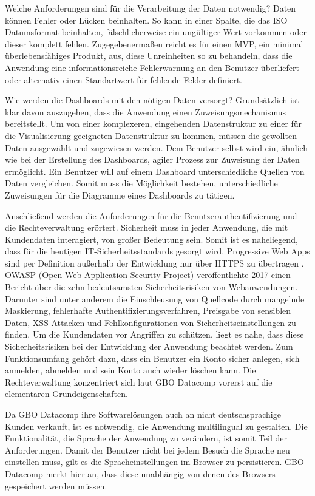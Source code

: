 Welche Anforderungen sind für die Verarbeitung der Daten notwendig? Daten können Fehler oder Lücken
beinhalten. So kann in einer Spalte, die das ISO Datumsformat beinhalten, fälschlicherweise ein
ungültiger Wert vorkommen oder dieser komplett fehlen. Zugegebenermaßen reicht es für einen MVP, ein
minimal überlebensfähiges Produkt, aus, diese Unreinheiten so zu behandeln, dass die Anwendung
eine informationsreiche Fehlerwarnung an den Benutzer überliefert oder alternativ einen Standartwert
für fehlende Felder definiert.

Wie werden die Dashboards mit den nötigen Daten versorgt? Grundsätzlich ist klar davon auszugehen,
dass die Anwendung einen Zuweisungsmechanismus bereitstellt. Um von einer komplexeren, eingehenden
Datenstruktur zu einer für die Visualisierung geeigneten Datenstruktur zu kommen, müssen die gewollten
Daten ausgewählt und zugewiesen werden. Dem Benutzer selbst wird ein, ähnlich wie bei der Erstellung
des Dashboards, agiler Prozess zur Zuweisung der Daten ermöglicht. Ein Benutzer will auf einem
Dashboard unterschiedliche Quellen von Daten vergleichen. Somit muss die Möglichkeit bestehen,
unterschiedliche Zuweisungen für die Diagramme eines Dashboards zu tätigen.

Anschließend werden die Anforderungen für die Benutzerauthentifizierung und die Rechteverwaltung erörtert.
Sicherheit muss in jeder Anwendung, die mit Kundendaten interagiert, von großer Bedeutung sein.
Somit ist es naheliegend, dass für die heutigen IT-Sicherheitsstandards gesorgt wird. Progressive
Web Apps sind per Definition außerhalb der Entwicklung nur über HTTPS zu übertragen \cite[S. 16]{KevinFrankPWAMasterarbeit}.
OWASP (Open Web Application Security Project) veröffentlichte 2017 einen Bericht über die zehn
bedeutsamsten Sicherheitsrisiken von Webanwendungen. Darunter sind unter anderem die Einschleusung
von Quellcode durch mangelnde Maskierung, fehlerhafte Authentifizierungsverfahren, Preisgabe von sensiblen Daten,
XSS-Attacken und Fehlkonfigurationen von Sicherheitseinstellungen zu finden.\cite[S. 4]{OWASPTopTen}
Um die Kundendaten vor Angriffen zu schützen, liegt es nahe, dass diese Sicherheitsrisiken bei der
Entwicklung der Anwendung beachtet werden. Zum Funktionsumfang gehört dazu,
dass ein Benutzer ein Konto sicher anlegen, sich anmelden, abmelden und sein Konto auch wieder
löschen kann. Die Rechteverwaltung konzentriert sich laut GBO Datacomp vorerst auf die elementaren
Grundeigenschaften.

Da GBO Datacomp ihre Softwarelösungen auch an nicht deutschsprachige Kunden verkauft, ist es notwendig,
die Anwendung multilingual zu gestalten. Die Funktionalität, die Sprache der Anwendung zu verändern,
ist somit Teil der Anforderungen. Damit der Benutzer nicht bei jedem Besuch die Sprache neu einstellen
muss, gilt es die Spracheinstellungen im Browser zu persistieren. GBO Datacomp merkt hier an, dass diese
unabhängig von denen des Browsers gespeichert werden müssen.

